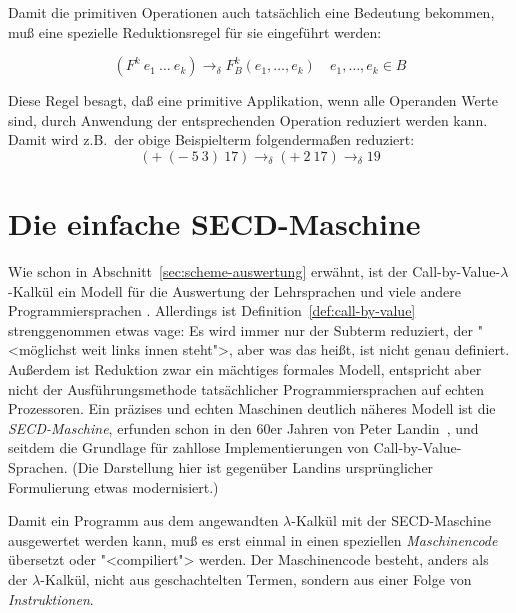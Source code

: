 Damit die primitiven Operationen auch tatsächlich eine Bedeutung
bekommen, muß eine spezielle Reduktionsregel für sie eingeführt
werden:
%
\begin{definition}
\begin{displaymath}
  (F^k~e_1~\ldots~e_k) \rightarrow_{\delta} F_B^k(e_1, \ldots, e_k)
  \quad e_1, \ldots, e_k \in B
\end{displaymath}
\end{definition}
%
Diese Regel besagt, daß eine primitive Applikation, wenn alle
Operanden Werte sind, durch Anwendung der entsprechenden Operation 
reduziert werden kann.  Damit wird z.B.\ der
obige Beispielterm folgendermaßen reduziert:
%
\begin{displaymath}
  (+~(-~5~3)~17) \rightarrow_{\delta} (+~2~17) \rightarrow_{\delta} 19
\end{displaymath}

\section{Die einfache SECD-Maschine}

Wie schon in Abschnitt~\ref{sec:scheme-auswertung} erwähnt, ist 
der Call-by-Value-$\lambda$-Kalkül
ein Modell für die Auswertung der Lehrsprachen und viele andere
Programmiersprachen .
Allerdings ist Definition~\ref{def:call-by-value} strenggenommen etwas
vage: Es wird immer nur der Subterm reduziert, der
"<möglichst weit links innen steht">, aber was das heißt, ist nicht
genau definiert.  Außerdem ist Reduktion zwar ein
mächtiges formales Modell, entspricht aber nicht der
Ausführungsmethode tatsächlicher Programmiersprachen auf echten
Prozessoren.  Ein präzises und echten Maschinen deutlich näheres
Modell ist die \textit{SECD-Maschine}, erfunden
schon in den 60er Jahren von Peter Landin~\cite{Landin1964}, und
seitdem die Grundlage für zahllose Implementierungen von
Call-by-Value-Sprachen.  (Die Darstellung hier ist gegenüber Landins
ursprünglicher Formulierung etwas modernisiert.)

Damit ein Programm aus dem angewandten $\lambda$-Kalkül mit der
SECD-Maschine ausgewertet werden kann, muß es erst einmal in einen
speziellen \textit{Maschinencode} übersetzt oder
"<compiliert"> werden.  Der Maschinencode besteht, anders als der
$\lambda$-Kalkül, nicht aus geschachtelten Termen, sondern aus einer
Folge von \textit{Instruktionen}.  


